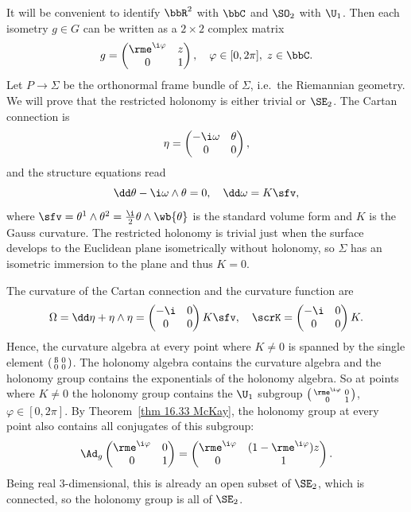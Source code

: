 It will be convenient to identify $\bbR^2$ with $\bbC$  and $\SO_2$ with $\U_1$. Then each isometry $g\in G$ can be written as a $2\times 2$ complex matrix 
\[g=\begin{pmatrix}
    \rme^{\i\varphi} & z\\
    0 & 1
\end{pmatrix},\quad \varphi\in [0,2\pi],\; z\in\bbC.\]
Let $P\to \varSigma$ be the orthonormal frame bundle of $\varSigma$, i.e.\ the Riemannian geometry. We will prove that the restricted holonomy is either trivial or $\SE_2$. The Cartan connection is 
\[\eta=\begin{pmatrix}
    -\i\omega & \theta\\
    0 & 0
\end{pmatrix},\]
and the structure equations read 
\[\dd \theta-\i\omega\wedge\theta=0,\quad \dd\omega=K\sfv,\]
where $\sfv=\theta^1\wedge\theta^2=\frac{\i}{2}\theta\wedge\wb{\theta}$ is the standard volume form and $K$ is the Gauss curvature. The restricted holonomy is trivial just when the surface develops to the Euclidean plane isometrically without holonomy, so $\varSigma$ has an isometric immersion to the plane and thus $K=0$.

The curvature of the Cartan connection and the curvature function are 
\[\Omega=\dd\eta+\eta\wedge\eta=\begin{pmatrix}
    -\i & 0\\0 & 0
\end{pmatrix}K\sfv,\quad \scrK=\begin{pmatrix}
    -\i & 0\\0& 0
\end{pmatrix}K.\]
Hence, the curvature algebra at every point where $K\neq 0$ is spanned by the single element $\left(\begin{smallmatrix}
    \i & 0\\0 & 0
\end{smallmatrix}\right)$. The holonomy algebra contains the curvature algebra and the holonomy group contains the exponentials of the holonomy algebra. So at points where $K\neq 0$ the holonomy group contains the $\U_1$ subgroup $\left(\begin{smallmatrix}
    \rme^{\i\varphi} & 0\\0 & 1
\end{smallmatrix}\right)$, $\varphi\in[0,2\pi]$. By Theorem~\ref{thm 16.33 McKay}, the holonomy group at every point also contains all conjugates of this subgroup:
\[\Ad_g \begin{pmatrix}
    \rme^{\i\varphi} & 0\\0 & 1
\end{pmatrix}=\begin{pmatrix}
    \rme^{\i\varphi} &(1-\rme^{\i\varphi})z\\0 & 1
\end{pmatrix}.\]
Being real $3$-dimensional, this is already an open subset of $\SE_2$, which is connected, so the holonomy group is all of $\SE_2$.

